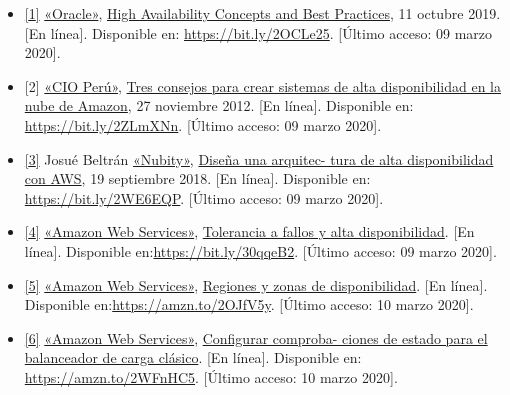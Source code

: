 \documentclass[12pt,spanish,Letterpaper,openany]{book}
\newcommand{\spacefourmilis}{\vspace{4mm}}
\begin{document}
\begin{itemize}
\item
  \hypertarget{articulo08_ref01}{}

  \protect\hyperlink{articulo08_cross01}{{[}1{]}} \href{https://docs.oracle.com/}{«Oracle»}, \href{https://docs.oracle.com/cd/A91202_01/901_doc/rac.901/a89867/pshavdtl.htm}{High Availability Concepts and Best Practices}, 11 octubre 2019. {[}En línea{]}. Disponible en: \url{https://bit.ly/2OCLe25}. {[}Último acceso: 09 marzo 2020{]}.
  \spacefourmilis
\item
  \hypertarget{articulo08_ref02}{}

  {[}2{]} \href{http://www.infoiarna.org.gt/}{«CIO Perú»}, \href{https://cioperu.pe/articulo/11721/tres-consejos-para-crear-sistemas-de-alta-disponibilidad-en-la/}{Tres consejos para crear sistemas de alta disponibilidad en la nube de Amazon}, 27 noviembre 2012. {[}En línea{]}. Disponible en: \url{https://bit.ly/2ZLmXNn}. {[}Último acceso: 09 marzo 2020{]}.
\item
  \hypertarget{articulo08_ref03}{}

  \protect\hyperlink{articulo08_cross03}{{[}3{]}} Josué Beltrán \href{https://blog.nubity.com/}{«Nubity»}, \href{https://blog.nubity.com/guia-disena-una-arquitectura-de-alta-disponibilidad-con-aws/}{Diseña una arquitec-
  tura de alta disponibilidad con AWS}, 19 septiembre 2018. {[}En línea{]}. Disponible en: \url{https://bit.ly/2WE6EQP}. {[}Último acceso: 09 marzo 2020{]}.
\item
  \hypertarget{articulo08_ref04}{}

  \protect\hyperlink{articulo08_cross04}{{[}4{]}} \href{https://media.amazonwebservices.com/}{«Amazon Web Services»}, \href{https://media.amazonwebservices.com/es/DataSheet_Architecture/RefArch_FaultToleranceHighAvailability_5Ar.pdf}{Tolerancia a fallos y alta disponibilidad}. {[}En línea{]}. Disponible en:\url{https://bit.ly/30qqeB2}. {[}Último acceso: 09 marzo 2020{]}.
\item
  \hypertarget{articulo08_ref05}{}

  \protect\hyperlink{articulo08_cross05}{{[}5{]}} \href{https://media.amazonwebservices.com/}{«Amazon Web Services»}, \href{https://docs.aws.amazon.com/es_es/autoscaling/ec2/userguide/AutoScalingGroup.html}{Regiones y zonas de disponibilidad}. {[}En línea{]}. Disponible en:\url{https://amzn.to/2OJfV5y}. {[}Último acceso: 10 marzo 2020{]}.
\item
  \hypertarget{articulo08_ref06}{}

  \protect\hyperlink{articulo08_cross06}{{[}6{]}} \href{https://docs.aws.amazon.com/}{«Amazon Web Services»}, \href{https://docs.aws.amazon.com/es_es/elasticloadbalancing/latest/classic/elb-healthchecks.html}{Configurar comproba-
  ciones de estado para el balanceador de carga clásico}. {[}En línea{]}. Disponible en: \url{https://amzn.to/2WFnHC5}. {[}Último acceso: 10 marzo 2020{]}.
\end{itemize}
\end{document}

